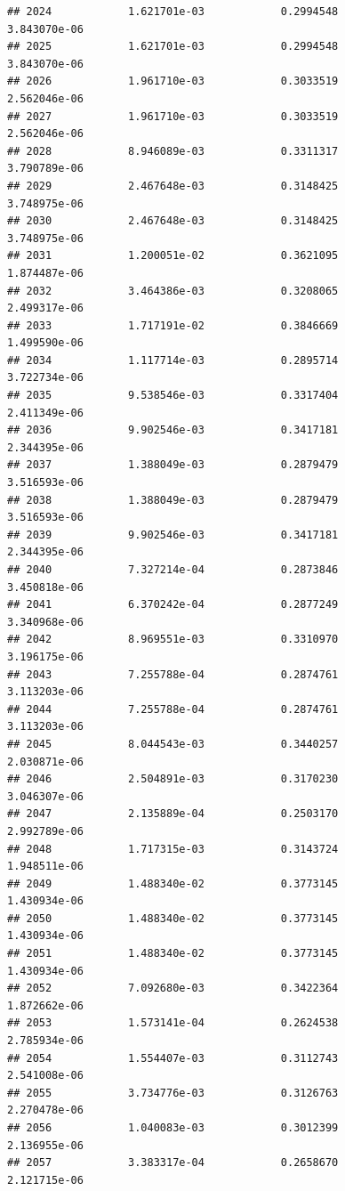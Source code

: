 \documentclass[
]{article}
\begin{document}
\begin{verbatim}
## 2024            1.621701e-03            0.2994548            3.843070e-06
## 2025            1.621701e-03            0.2994548            3.843070e-06
## 2026            1.961710e-03            0.3033519            2.562046e-06
## 2027            1.961710e-03            0.3033519            2.562046e-06
## 2028            8.946089e-03            0.3311317            3.790789e-06
## 2029            2.467648e-03            0.3148425            3.748975e-06
## 2030            2.467648e-03            0.3148425            3.748975e-06
## 2031            1.200051e-02            0.3621095            1.874487e-06
## 2032            3.464386e-03            0.3208065            2.499317e-06
## 2033            1.717191e-02            0.3846669            1.499590e-06
## 2034            1.117714e-03            0.2895714            3.722734e-06
## 2035            9.538546e-03            0.3317404            2.411349e-06
## 2036            9.902546e-03            0.3417181            2.344395e-06
## 2037            1.388049e-03            0.2879479            3.516593e-06
## 2038            1.388049e-03            0.2879479            3.516593e-06
## 2039            9.902546e-03            0.3417181            2.344395e-06
## 2040            7.327214e-04            0.2873846            3.450818e-06
## 2041            6.370242e-04            0.2877249            3.340968e-06
## 2042            8.969551e-03            0.3310970            3.196175e-06
## 2043            7.255788e-04            0.2874761            3.113203e-06
## 2044            7.255788e-04            0.2874761            3.113203e-06
## 2045            8.044543e-03            0.3440257            2.030871e-06
## 2046            2.504891e-03            0.3170230            3.046307e-06
## 2047            2.135889e-04            0.2503170            2.992789e-06
## 2048            1.717315e-03            0.3143724            1.948511e-06
## 2049            1.488340e-02            0.3773145            1.430934e-06
## 2050            1.488340e-02            0.3773145            1.430934e-06
## 2051            1.488340e-02            0.3773145            1.430934e-06
## 2052            7.092680e-03            0.3422364            1.872662e-06
## 2053            1.573141e-04            0.2624538            2.785934e-06
## 2054            1.554407e-03            0.3112743            2.541008e-06
## 2055            3.734776e-03            0.3126763            2.270478e-06
## 2056            1.040083e-03            0.3012399            2.136955e-06
## 2057            3.383317e-04            0.2658670            2.121715e-06

\end{verbatim}
\end{document}
